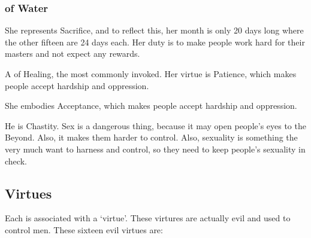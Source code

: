 \subsubsection{\Sephiroth{} of Water}
\begin{sephlist}
  \seph{\Gamishiel{}}
    She represents Sacrifice, and to reflect this, her month is only 20 days long where the other fifteen are 24 days each. Her duty is to make people work hard for their masters and not expect any rewards. 
  
  \seph{\Ishiel{}}
    A \Sephirah{} of Healing, the most commonly invoked. Her virtue is Patience, which makes people accept hardship and oppression. 
  
  \seph{\Omariel{}}
    She embodies Acceptance, which makes people accept hardship and oppression. 
  
  \seph{\Yeziel{}}
    He is Chastity. Sex is a dangerous thing, because it may open people's eyes to the Beyond. Also, it makes them harder to control. Also, \human{} sexuality is something the \banes{} very much want to harness and control, so they need \Yeziel{} to keep people's sexuality in check. 

\end{sephlist}



\subsection{Virtues}
Each \Sephirah{} is associated with a `virtue'. These virtures are actually evil and used to control men. These sixteen evil virtues are: 

